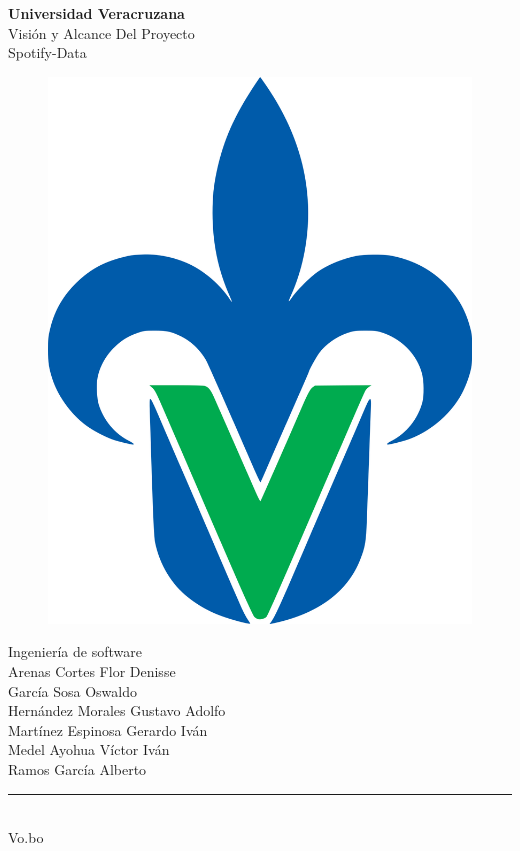 \begin{titlepage}
	\begin{center}
	{\huge \textbf{Universidad Veracruzana}}\\
	\vspace{2cm}  
	{\Large {Visión y Alcance Del Proyecto}}\\
	\vspace{5mm}	
	{\Large {Spotify-Data}}\\
	\begin{figure}[h]
		\centering
		\includegraphics[scale=0.10]{uvlogo}
	\end{figure}
	{\Large {Ingeniería de software}}\\
    \vspace{2cm}
	{\Large {Arenas Cortes Flor Denisse}}\\
	\vspace{5mm}	
	{\Large {García Sosa Oswaldo }}\\
	\vspace{5mm}	
	{\Large {Hernández Morales Gustavo Adolfo }}\\
	\vspace{5mm}	
	{\Large {Martínez Espinosa Gerardo Iván}}\\
	\vspace{5mm}	
	{\Large {Medel Ayohua Víctor Iván}}\\
	\vspace{3mm}	
	{\Large {Ramos García Alberto}}\\
	\vspace{2cm}	
    \rule{8cm}{0.5mm} \\ \Large Vo.bo\\ 
	\end{center}
\end{titlepage}